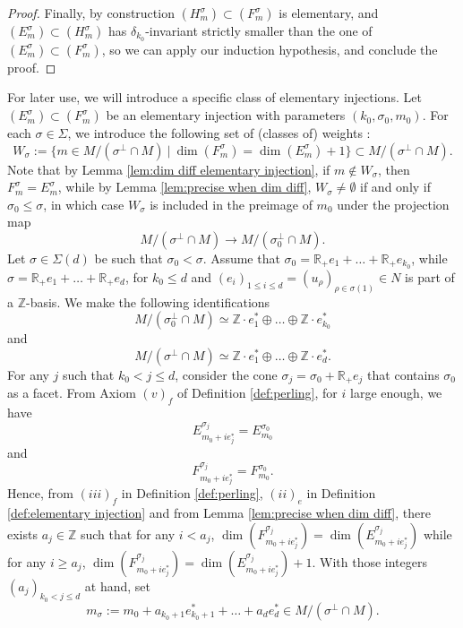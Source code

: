 \documentclass[a4paper,10pt]{amsart}
\theoremstyle{plain}{
    \newtheorem{theorem}{Theorem}[section]
    \newtheorem{lemma}[theorem]{Lemma}
    \newtheorem{corollary}[theorem]{Corollary}
    \newtheorem{proposition}[theorem]{Proposition}
    \newtheorem{conjecture}[theorem]{Conjecture}
}
\theoremstyle{definition}{
    \newtheorem{definition}[theorem]{Definition}
    \newtheorem{defn-thm}[theorem]{Definition-Theorem}
    \newtheorem{example}[theorem]{Example}
    \newtheorem{notation}[theorem]{Notation}
}
\theoremstyle{remark}{
    \newtheorem{remark}[theorem]{Remark}
    \newtheorem{problem}[theorem]{Problem}
    \newtheorem{question}[theorem]{Question}
}
\def\R{\mathbb{R}}
\def\Z{\mathbb{Z}}
\begin{document}
\begin{proof}
 
 
 
 Finally, by construction $(H^\sigma_m)\subset (F^\sigma_m)$ is elementary, and $(E^\sigma_m)\subset (H^\sigma_m)$ has $\delta_{k_0}$-invariant strictly smaller than the one of $(E^\sigma_m)\subset (F^\sigma_m)$,  so we can apply our induction hypothesis, and conclude the proof.
\end{proof}

For later use, we will introduce a specific class of elementary injections. Let $(E^\sigma_m)\subset (F^\sigma_m)$ be an elementary injection with parameters $(k_0,\sigma_0,m_0)$. For each $\sigma\in \Sigma$, we introduce the following set of (classes of) weights :
\begin{equation}
 \label{eq:definition Wsigma}
W_\sigma:=\lbrace m\in M/(\sigma^\perp\cap M)\:\vert\: \dim(F^\sigma_m)=\dim(E^\sigma_m)+1\rbrace\subset M/(\sigma^\perp\cap M).
\end{equation}
Note that by Lemma \ref{lem:dim diff elementary injection}, if $m\notin W_\sigma$, then $F^\sigma_m=E^\sigma_m$, while by Lemma \ref{lem:precise when dim diff}, $W_\sigma\neq \emptyset$ if and only if $\sigma_0\leq \sigma$, in which case $W_\sigma$ is included in the preimage of $m_0$ under the projection map 
$$
M/(\sigma^\perp\cap M)\to M/(\sigma_0^\perp\cap M).
$$
  Let $\sigma\in\Sigma(d)$ be such that $\sigma_0 <\sigma$.  Assume  that $\sigma_0=\R_+e_1+\ldots+\R_+e_{k_0}$, while $\sigma=\R_+e_1+\ldots+\R_+e_d$, for $k_0\leq d$ and $(e_i)_{1\leq i\leq d}=(u_\rho)_{\rho\in\sigma(1)}\in N$ is part of a $\Z$-basis. We make the following identifications 
$$
M/(\sigma_0^\perp\cap M)\simeq \Z\cdot e_1^*\oplus\ldots\oplus\Z\cdot e_{k_0}^*
$$
and 
$$
M/(\sigma^\perp\cap M)\simeq \Z\cdot e_1^*\oplus\ldots\oplus\Z\cdot e_{d}^*.
$$
For any $j$ such that $k_0< j \leq d$, consider the cone $\sigma_j=\sigma_0+\R_+e_j$ that contains $\sigma_0$ as a facet.  From Axiom $(v)_f$ of Definition \ref{def:perling}, for $i$ large enough, we have 
$$
E^{\sigma_j}_{m_0+ie_j^*}=E^{\sigma_0}_{m_0}
$$
and 
$$
F^{\sigma_j}_{m_0+ie_j^*}=F^{\sigma_0}_{m_0}.
$$
Hence, from $(iii)_f$ in Definition \ref{def:perling}, $(ii)_e$ in Definition \ref{def:elementary injection} and from Lemma \ref{lem:precise when dim diff}, there exists $a_j\in\Z$ such that for any $i < a_j$, $\dim(F^{\sigma_j}_{m_0+ie_j^*})=\dim(E^{\sigma_j}_{m_0+ie_j^*})$ while for any $ i\geq a_j$, $\dim(F^{\sigma_j}_{m_0+ie_j^*})=\dim(E^{\sigma_j}_{m_0+ie_j^*})+1$. With those integers $(a_j)_{k_0< j\leq d}$ at hand, set 
\begin{equation}
 \label{eq:msigma}
m_\sigma:=m_0+a_{k_0+1}e_{k_0+1}^*+\ldots+a_d e_d^*\in M/(\sigma^\perp\cap M).
\end{equation}
\end{document}
